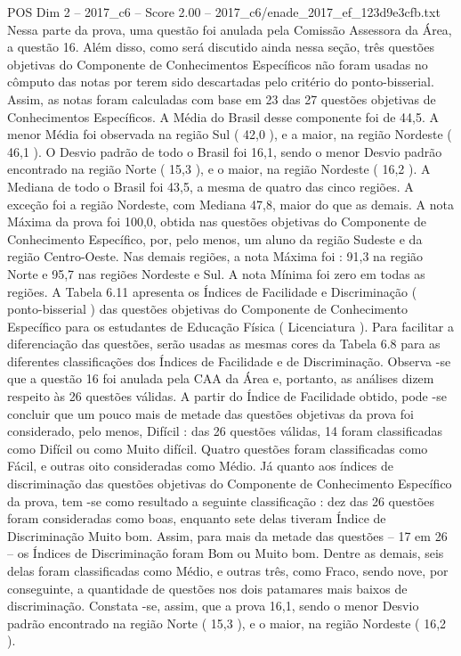 \begin{textsample}{POS Dim 2 – 2017\_c6 – Score 2.00 – 2017\_c6/enade\_2017\_ef\_123d9e3cfb.txt}
Nessa parte da prova, uma questão foi anulada pela Comissão Assessora da Área, a questão 16.
Além disso, como será discutido ainda nessa seção, três questões objetivas do Componente de Conhecimentos Específicos não foram usadas no cômputo das notas por terem sido descartadas pelo critério do ponto-bisserial.
Assim, as notas foram calculadas com base em 23 das 27 questões objetivas de Conhecimentos Específicos.
A Média do Brasil desse componente foi de 44,5.
A menor Média foi observada na região Sul ( 42,0 ), e a maior, na região Nordeste ( 46,1 ).
O Desvio padrão de todo o Brasil foi 16,1, sendo o menor Desvio padrão encontrado na região Norte ( 15,3 ), e o maior, na região Nordeste ( 16,2 ).
A Mediana de todo o Brasil foi 43,5, a mesma de quatro das cinco regiões.
A exceção foi a região Nordeste, com Mediana 47,8, maior do que as demais.
A nota Máxima da prova foi 100,0, obtida nas questões objetivas do Componente de Conhecimento Específico, por, pelo menos, um aluno da região Sudeste e da região Centro-Oeste.
Nas demais regiões, a nota Máxima foi : 91,3 na região Norte e 95,7 nas regiões Nordeste e Sul.
A nota Mínima foi zero em todas as regiões.
A Tabela 6.11 apresenta os Índices de Facilidade e Discriminação ( ponto-bisserial ) das questões objetivas do Componente de Conhecimento Específico para os estudantes de Educação Física ( Licenciatura ).
Para facilitar a diferenciação das questões, serão usadas as mesmas cores da Tabela 6.8 para as diferentes classificações dos Índices de Facilidade e de Discriminação.
Observa -se que a questão 16 foi anulada pela CAA da Área e, portanto, as análises dizem respeito às 26 questões válidas.
A partir do Índice de Facilidade obtido, pode -se concluir que um pouco mais de metade das questões objetivas da prova foi considerado, pelo menos, Difícil : das 26 questões válidas, 14 foram classificadas como Difícil ou como Muito difícil.
Quatro questões foram classificadas como Fácil, e outras oito consideradas como Médio.
Já quanto aos índices de discriminação das questões objetivas do Componente de Conhecimento Específico da prova, tem -se como resultado a seguinte classificação : dez das 26 questões foram consideradas como boas, enquanto sete delas tiveram Índice de Discriminação Muito bom.
Assim, para mais da metade das questões – 17 em 26 – os Índices de Discriminação foram Bom ou Muito bom.
Dentre as demais, seis delas foram classificadas como Médio, e outras três, como Fraco, sendo nove, por conseguinte, a quantidade de questões nos dois patamares mais baixos de discriminação.
Constata -se, assim, que a prova 16,1, sendo o menor Desvio padrão encontrado na região Norte ( 15,3 ), e o maior, na região Nordeste ( 16,2 ).

\end{textsample}
